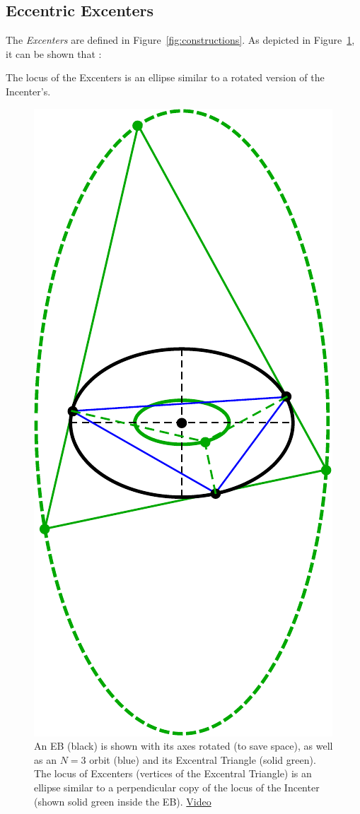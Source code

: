\subsection{Eccentric Excenters}

The {\em Excenters} are defined in Figure~\ref{fig:constructions}. As depicted in Figure~\ref{fig:locus-incenter-excenter}, it can be shown that \cite{ronaldo19}:

\begin{theorem}
The locus of the Excenters is an ellipse similar to a rotated version of the Incenter's.
\end{theorem}
%
%
\begin{figure}[H]
    \centering
    \includegraphics[angle=90,width=.66\textwidth]{pics/u0025_incenter_excenter_locus.pdf}
    \caption{An EB (black) is shown with its axes rotated (to save space), as well as an $N=3$ orbit (blue) and its Excentral Triangle (solid green). The locus of Excenters (vertices of the Excentral Triangle) is an ellipse similar to a perpendicular copy of the locus of the Incenter (shown solid green inside the EB). \href{https://youtu.be/Xxr1DUo19_w}{Video} \cite[pl\#8]{dsr_math_intell_playlist}}
    \label{fig:locus-incenter-excenter}
\end{figure}
%


